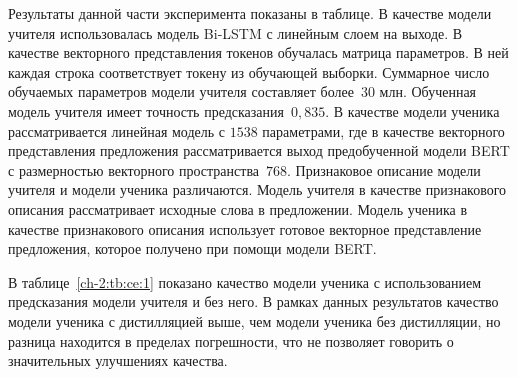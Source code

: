 Результаты данной части эксперимента показаны в таблице. В качестве модели учителя использовалась модель Bi-LSTM с линейным слоем на выходе. В качестве векторного представления токенов обучалась матрица параметров. В ней каждая строка соответствует токену из обучающей выборки. Суммарное число обучаемых параметров модели учителя составляет более~$30$ млн. Обученная модель учителя имеет точность предсказания~$0{,}835$. В качестве модели ученика рассматривается линейная модель с $1538$ параметрами, где в качестве векторного представления предложения рассматривается выход предобученной модели BERT с размерностью векторного пространства~$768$. Признаковое описание модели учителя и модели ученика различаются. Модель учителя в качестве признакового описания рассматривает исходные слова в предложении. Модель ученика в качестве признакового описания использует готовое векторное представление предложения, которое получено при помощи модели BERT.

В таблице~\ref{ch-2:tb:ce:1} показано качество модели ученика с использованием предсказания модели учителя и без него. В рамках данных результатов качество модели ученика с дистилляцией выше, чем модели ученика без дистилляции, но разница находится в пределах погрешности, что не позволяет говорить о значительных улучшениях качества.

